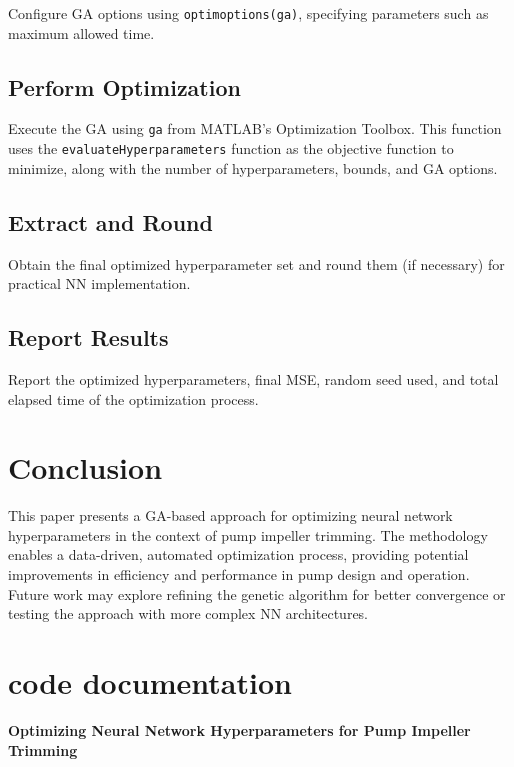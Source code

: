 \documentclass[
  super,
  review,
  3p]{elsarticle}
\begin{document}
Configure GA options using
\texttt{optimoptions(\textquotesingle{}ga\textquotesingle{})},
specifying parameters such as maximum allowed time.

\subsection{Perform Optimization}\label{perform-optimization}

Execute the GA using \texttt{ga} from MATLAB's Optimization Toolbox.
This function uses the \texttt{evaluateHyperparameters} function as the
objective function to minimize, along with the number of
hyperparameters, bounds, and GA options.

\subsection{Extract and Round}\label{extract-and-round}

Obtain the final optimized hyperparameter set and round them (if
necessary) for practical NN implementation.

\subsection{Report Results}\label{report-results}

Report the optimized hyperparameters, final MSE, random seed used, and
total elapsed time of the optimization process.

\section{Conclusion}\label{conclusion}

This paper presents a GA-based approach for optimizing neural network
hyperparameters in the context of pump impeller trimming. The
methodology enables a data-driven, automated optimization process,
providing potential improvements in efficiency and performance in pump
design and operation. Future work may explore refining the genetic
algorithm for better convergence or testing the approach with more
complex NN architectures.

\section{code documentation}\label{code-documentation}

\textbf{Optimizing Neural Network Hyperparameters for Pump Impeller
Trimming}
\end{document}
